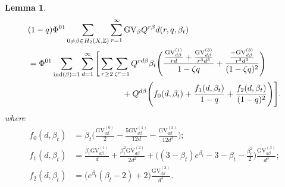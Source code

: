 \documentclass[11pt]{amsart}
\newtheorem{lemma}[theorem]{Lemma}
\newtheorem*{main theorem*}{Main Theorem}
\theoremstyle{remark}
\numberwithin{equation}{section}
\newcommand{\GV}{{\mathrm{GV}}}
\begin{document}
\begin{lemma} \label{lemma_d_expansion}
\[
\begin{split}
   &(1-q) \Phi^{01} \sum_{0\neq \beta \in H_2(X, \mathbb{Z})} \sum_{r=1}^{\infty} \GV_{\beta} Q^{r\beta} d(r,q,\beta_t)
   \\
   & = \Phi^{01} \sum_{{\rm ind}(\beta)=1} \sum_{d=1}^{\infty} \Bigg[ \sum_{r\geq 2}\sum_{\zeta^r=1} Q^{rd\beta} \beta_t\Bigg( \frac{ \frac{\GV^{(1)}_{d\beta}}{rd} + \frac{\GV_{d\beta}^{(3)}}{r^3d^3} }{1-\zeta q} + \frac{ \frac{-\GV_{d\beta}^{(3)}}{r^3d^3} }{(1-\zeta q)^2}  \Bigg) 
    \\
    &\hspace{40mm}  + Q^{d\beta} \Bigg(  f_0(d,\beta_t)  + \frac{f_1(d,\beta_t)}{1-q} +  \frac{f_2(d,\beta_t) }{(1-q)^2} \Bigg) \Bigg].
\end{split}   
\] 
where
\[
\begin{split}
    f_0(d,\beta_t) &= \beta_t \Big(\frac{\GV_{d\beta}^{(0)}}{2} - \frac{5\GV_{d\beta}^{(1)}}{12d} - \frac{ \GV_{d\beta}^{(3)} }{12d^3} \Big);
    \\
    f_1(d,\beta_t) &= \frac{\beta_t \GV_{d\beta}^{(1)}}{d} + \frac{ \beta_t^2 \GV_{d\beta}^{(2)} }{2d^2} + \Big( (3-\beta_t)e^{\beta_t}-3-\beta_t - \frac{\beta_t^2}{2} \Big)\frac{ \GV_{d\beta}^{(3)}}{d^3};
    \\
    f_2(d,\beta_t) &= \Big(e^{\beta_t}(\beta_t-2) + 2 \Big)\frac{ \GV_{d\beta}^{(3)} }{d^3}.
\end{split}
\]
\end{lemma}
\end{document}
